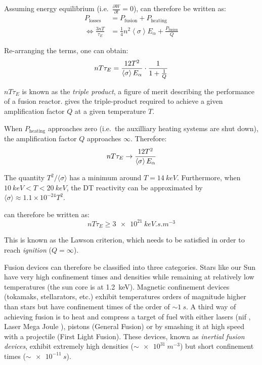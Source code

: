 Assuming energy equilibrium (i.e.\ $\frac{\partial W}{\partial t} = 0$),  can therefore be written as:
\begin{align}
    P_\mathrm{losses} &= P_\mathrm{fusion} + P_\mathrm{heating} \\
    \Leftrightarrow \frac{3 n T}{\tau_E} &= \frac{1}{4} n^2 \left\langle \sigma \right\rangle E_\alpha + \frac{P_\mathrm{fusion}}{Q}
\end{align}

Re-arranging the terms, one can obtain:
\begin{equation}
    n T \tau_E = \frac{12 T^2}{\left\langle \sigma \right\rangle E_\alpha} \cdot \frac{1}{1 + \frac{1}{Q}}
    \labeq{triple product}
\end{equation}

$n T \tau_E$ is known as the \textit{triple product}, a figure of merit describing the performance of a fusion reactor.
 gives the triple-product required to achieve a given amplification factor $Q$ at a given temperature $T$.

When $P_\mathrm{heating}$ approaches zero (i.e.\ the auxilliary heating systems are shut down), the amplification factor $Q$ approaches $\infty$.
Therefore:
\begin{equation}
    n T \tau_E \rightarrow \frac{12 T^2}{\left\langle \sigma \right\rangle E_\alpha}
    \labeq{triple product infinity}
\end{equation}

The quantity $T^2/\langle \sigma \rangle$ has a minimum around $T=\SI{14}{keV}$.
Furthermore, when $\SI{10}{keV} < T < \SI{20}{keV}$, the DT reactivity can be approximated by $\langle \sigma \rangle \approx 1.1 \times 10^{-24} T^2$.

 can therefore be written as:
\begin{equation}
    n T \tau_E \geq \SI{3e21}{keV.s.m^{-3}}
\end{equation}

This is known as the Lawson criterion, which needs to be satisfied in order to reach \textit{ignition} ($Q = \infty$).


Fusion devices can therefore be classified into three categories.
Stars like our Sun have very high confinement times and densities while remaining at relatively low temperatures (the sun core is at \SI{1.2}{keV}).
Magnetic confinement devices (\glspl{tokamak}, \glspl{stellarator}, etc.) exhibit temperatures orders of magnitude higher than stars but have confinement times of the order of $\sim \SI{1}{s}$.
A third way of achieving fusion is to heat and compress a target of fuel with either lasers (\acrshort{nif} , Laser Mega Joule ), pistons (General Fusion) or by smashing it at high speed with a projectile (First Light Fusion).
These devices, known as \textit{inertial fusion devices}, exhibit extremely high densities ($\sim \SI{e31}{m^{-3}}$) but short confinement times ($\sim \SI{e-11}{s}$).
 
